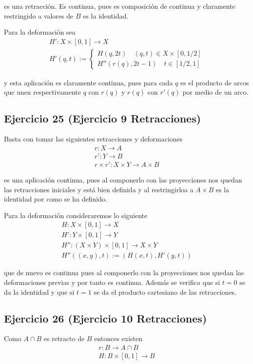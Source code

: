\documentclass{article}
\begin{document}
es una retracción. Es continua, pues es composición de continua y claramente restringido a valores de $B$ es la identidad.

Para la deformación sea
\begin{gather*}
H':X\times [0,1]\rightarrow X\\
H'(q,t):=\left\lbrace \begin{array}{c}
H(q,2t)\quad (q,t)\in X\times[0,1/2]\\
H''(r(q),2t-1)\quad t\in [1/2,1]
\end{array}\right.
\end{gather*}

y esta aplicación es claramente continua, pues para cada $q$ es el producto de arcos que unen  respectivamente $q$ con $r(q)$ y $r(q)$ con $r'(q)$ por medio de un arco.

\subsection{Ejercicio 25 (Ejercicio 9 Retracciones)}
Basta con tomar las siguientes retracciones y deformaciones
\begin{gather*}
r:X\rightarrow A\\
r':Y\rightarrow B\\
r\times r':X\times Y \rightarrow A\times B
\end{gather*}

es una aplicación continua, pues al componerlo con las proyecciones nos quedan las retracciones iniciales y está bien definida y al restringirloa a $A\times B$ es la identidad por como se ha definido.

Para la deformación consideraremos lo siguiente
\begin{gather*}
H:X\times [0,1]\rightarrow X\\
H':Y\times [0,1]\rightarrow Y\\
H'':(X\times Y)\times [0,1]\rightarrow X\times Y\\
H''((x,y),t):=(H(x,t),H'(y,t))
\end{gather*}

que de nuevo es continua pues al componerlo con la proyecciones nos quedan las deformaciones previas y por tanto es continua. Además se verifica que si $t=0$ se da la identidad y que si $t=1$ se da el producto cartesiano de las retracciones.

\subsection{Ejercicio 26 (Ejercicio 10 Retracciones)}
Como $A\cap B$ es retracto de $B$ entonces existen
\begin{gather*}
r:B\rightarrow A\cap B\\
H:B\times [0,1]\rightarrow B
\end{gather*}
\end{document}
